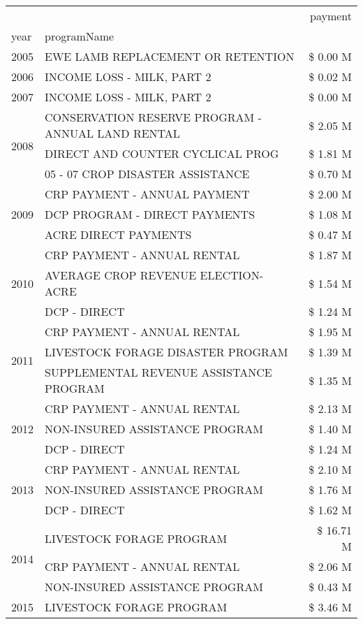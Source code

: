 \begin{tabular}{llr}
\toprule
 &  & payment \\
year & programName &  \\
\midrule
2005 & EWE LAMB REPLACEMENT OR RETENTION & \$ 0.00 M \\
\cline{1-3}
2006 & INCOME LOSS - MILK, PART 2 & \$ 0.02 M \\
\cline{1-3}
2007 & INCOME LOSS - MILK, PART 2 & \$ 0.00 M \\
\cline{1-3}
\multirow[t]{3}{*}{2008} & CONSERVATION RESERVE PROGRAM - ANNUAL LAND RENTAL & \$ 2.05 M \\
 & DIRECT AND COUNTER CYCLICAL PROG & \$ 1.81 M \\
 & 05 - 07 CROP DISASTER ASSISTANCE & \$ 0.70 M \\
\cline{1-3}
\multirow[t]{3}{*}{2009} & CRP PAYMENT - ANNUAL PAYMENT & \$ 2.00 M \\
 & DCP PROGRAM - DIRECT PAYMENTS & \$ 1.08 M \\
 & ACRE DIRECT PAYMENTS & \$ 0.47 M \\
\cline{1-3}
\multirow[t]{3}{*}{2010} & CRP PAYMENT - ANNUAL RENTAL & \$ 1.87 M \\
 & AVERAGE CROP REVENUE ELECTION-ACRE & \$ 1.54 M \\
 & DCP - DIRECT & \$ 1.24 M \\
\cline{1-3}
\multirow[t]{3}{*}{2011} & CRP PAYMENT - ANNUAL RENTAL & \$ 1.95 M \\
 & LIVESTOCK FORAGE DISASTER PROGRAM & \$ 1.39 M \\
 & SUPPLEMENTAL REVENUE ASSISTANCE PROGRAM & \$ 1.35 M \\
\cline{1-3}
\multirow[t]{3}{*}{2012} & CRP PAYMENT - ANNUAL RENTAL & \$ 2.13 M \\
 & NON-INSURED ASSISTANCE PROGRAM & \$ 1.40 M \\
 & DCP - DIRECT & \$ 1.24 M \\
\cline{1-3}
\multirow[t]{3}{*}{2013} & CRP PAYMENT - ANNUAL RENTAL & \$ 2.10 M \\
 & NON-INSURED ASSISTANCE PROGRAM & \$ 1.76 M \\
 & DCP - DIRECT & \$ 1.62 M \\
\cline{1-3}
\multirow[t]{3}{*}{2014} & LIVESTOCK FORAGE PROGRAM & \$ 16.71 M \\
 & CRP PAYMENT - ANNUAL RENTAL & \$ 2.06 M \\
 & NON-INSURED ASSISTANCE PROGRAM & \$ 0.43 M \\
\cline{1-3}
\multirow[t]{3}{*}{2015} & LIVESTOCK FORAGE PROGRAM & \$ 3.46 M \\

\end{tabular}

